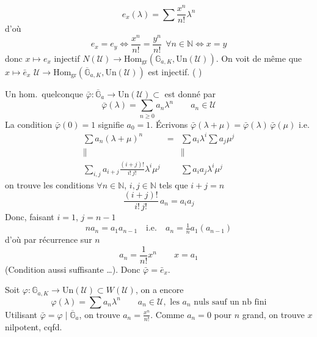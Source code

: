 \documentclass[11pt,a4paper]{article}
\begin{document}
\[
e_x(\lambda) = \sum \frac{x^n}{n!} \lambda^n
\]
d'où
\[
e_x = e_y \Longleftrightarrow \frac{x^n}{n!} = \frac{y^n}{n!} \ \ \forall n \in \mathbb{N} \Longleftrightarrow x = y
\]
donc $x \mapsto e_x$ injectif
$N(\mathcal{U}) \to \mathrm{Hom}_{\mathrm{gr}}(\mathbb{G}_{a,K}, \mathrm{Un}(\mathcal{U}))$.
On voit de même que $x \mapsto \bar e_x$
$\mathcal{U} \to \mathrm{Hom}_{\mathrm{gr}}(\overline{\mathbb{G}}_{a,K}, \mathrm{Un}(\mathcal{U}))$
est injectif. (\ill{} )

Un hom.\ quelconque
$\bar\varphi : \overline{\mathbb{G}}_a \to \mathrm{Un}(\mathcal{U}) \subset$
 est donné par
\[
\bar\varphi(\lambda) = \sum_{n \geq 0} a_n \lambda^n \qquad a_n \in \mathcal{U}
\]
La condition $\bar\varphi(0) = 1$ signifie $a_0 = 1$. Écrivons
$\bar\varphi(\lambda + \mu) = \bar\varphi(\lambda)\, \bar\varphi(\mu)$ i.e.
\[
\begin{array}{ccc}
\sum a_n (\lambda + \mu)^n & = & \sum a_i \lambda^i \sum a_j \mu^j \\
\| & & \| \\
\sum_{i,j} a_{i+j} \frac{(i+j)!}{i!\,j!} \lambda^i \mu^j & & \sum a_i a_j \lambda^i \mu^j
\end{array}
\]
on trouve les conditions $\forall n \in \mathbb{N}$, $i, j \in \mathbb{N}$
tels que $i + j = n$
\[
\frac{(i+j)!}{i!\,j!}\, a_n = a_i a_j
\]
Donc, faisant $i = 1$, $j = n - 1$
\[
n a_n = a_1 a_{n-1} \quad \text{i.e.} \quad a_n = \tfrac{1}{n} a_1 (a_{n-1})
\]
d'où par récurrence sur $n$
\[
a_n = \frac{1}{n!} x^n \qquad x = a_1
\]
(Condition aussi suffisante …). Donc $\bar\varphi = \bar e_x$.

Soit $\varphi : \mathbb{G}_{a,K} \to \mathrm{Un}(\mathcal{U}) \subset W(\mathcal{U})$,
\struck{\ill{}} on a encore
\[
\varphi(\lambda) = \sum a_n \lambda^n \qquad a_n \in \mathcal{U}, \text{ les } a_n \text{ nuls sauf un nb fini}
\]
Utilisant $\bar\varphi = \varphi \mid \overline{\mathbb{G}}_a$, on trouve
$a_n = \frac{x^n}{n!}$. Comme $a_n = 0$ pour $n$ grand, on trouve $x$
nilpotent, cqfd.
\end{document}
